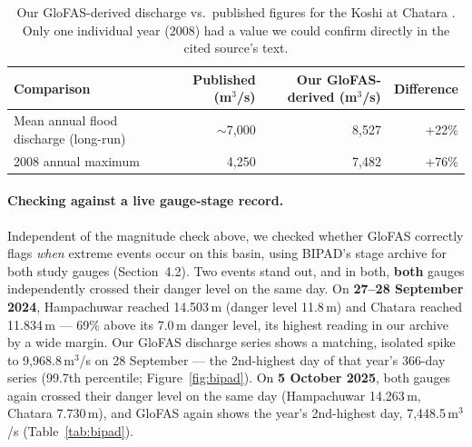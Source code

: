 \documentclass[11pt]{article}
\begin{document}
\begin{table}[h]
\centering
\small
\begin{tabular}{@{}lrrr@{}}
\toprule
Comparison & Published (m$^3$/s) & Our GloFAS-derived (m$^3$/s) & Difference \\
\midrule
Mean annual flood discharge (long-run) & ${\sim}$7,000 & 8,527 & +22\% \\
2008 annual maximum & 4,250 & 7,482 & +76\% \\
\bottomrule
\end{tabular}
\caption{Our GloFAS-derived discharge vs.\ published figures for the Koshi at Chatara \citep{devkota2012koshibarrage}. Only one individual year (2008) had a value we could confirm directly in the cited source's text.}
\label{tab:validation}
\end{table}

\paragraph{Checking against a live gauge-stage record.} Independent of the magnitude check above, we checked whether GloFAS correctly flags \emph{when} extreme events occur on this basin, using BIPAD's stage archive for both study gauges (Section~4.2). Two events stand out, and in both, \textbf{both} gauges independently crossed their danger level on the same day. On \textbf{27--28 September 2024}, Hampachuwar reached 14.503\,m (danger level 11.8\,m) and Chatara reached 11.834\,m --- 69\% above its 7.0\,m danger level, its highest reading in our archive by a wide margin. Our GloFAS discharge series shows a matching, isolated spike to 9,968.8\,m$^3$/s on 28 September --- the 2nd-highest day of that year's 366-day series (99.7th percentile; Figure~\ref{fig:bipad}). On \textbf{5 October 2025}, both gauges again crossed their danger level on the same day (Hampachuwar 14.263\,m, Chatara 7.730\,m), and GloFAS again shows the year's 2nd-highest day, 7,448.5\,m$^3$/s (Table~\ref{tab:bipad}).
\end{document}
